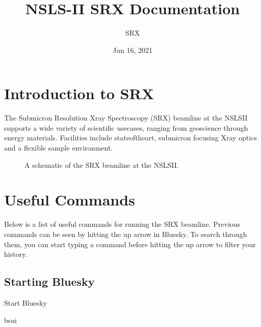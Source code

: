 \documentclass[letterpaper,10pt,english]{sphinxmanual}
\title{NSLS-II SRX Documentation}
\date{Jun 16, 2021}
\author{SRX}
\begin{document}
\pagestyle{empty}
\sphinxmaketitle
\pagestyle{plain}
\sphinxtableofcontents
\pagestyle{normal}
\label{\detokenize{index::doc}}



\chapter{Introduction to SRX}
\label{\detokenize{intro:introduction-to-srx}}\label{\detokenize{intro::doc}}
\sphinxAtStartPar
The Sub\sphinxhyphen{}micron Resolution X\sphinxhyphen{}ray Spectroscopy (SRX) beamline at the NSLS\sphinxhyphen{}II supports a wide variety of scientific use\sphinxhyphen{}cases, ranging from geoscience through energy materials. Facilities include state\sphinxhyphen{}of\sphinxhyphen{}the\sphinxhyphen{}art, sub\sphinxhyphen{}micron focusing X\sphinxhyphen{}ray optics and a flexible sample environment.

\begin{figure}[htbp]
\centering
\capstart

\caption{A schematic of the SRX beamline at the NSLS\sphinxhyphen{}II.}\label{\detokenize{intro:id1}}\label{\detokenize{intro:fig-prompt}}\end{figure}


\chapter{Useful Commands}
\label{\detokenize{useful:useful-commands}}\label{\detokenize{useful::doc}}
\sphinxAtStartPar
Below is a list of useful commands for running the SRX beamline. Previous commands can be seen by hitting the up arrow in Bluesky. To search through them, you can start typing a command before hitting the up arrow to filter your history.


\section{Starting Bluesky}
\label{\detokenize{useful:starting-bluesky}}
\sphinxAtStartPar
Start Bluesky \sphinxhyphen{} 

\begin{sphinxVerbatim}[commandchars=\\\{\}]
\PYGZdl{} bsui
\end{sphinxVerbatim}
\end{document}
